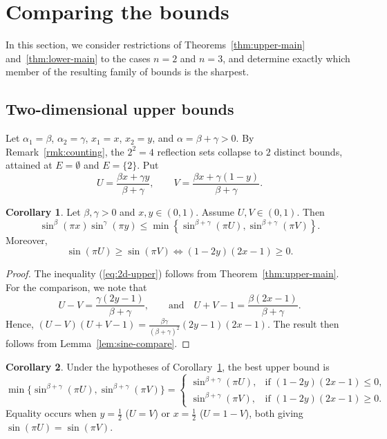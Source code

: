 \documentclass[12pt]{amsart}
\theoremstyle{definition}
\newtheorem{corollary}{Corollary}[section]
\begin{document}

\section{Comparing the bounds}
\label{sec:compare}

In this section, we consider restrictions of Theorems~\ref{thm:upper-main} and~\ref{thm:lower-main} to the cases $n=2$ and
$n=3$, and determine exactly which member of the resulting family of bounds is the sharpest.

\subsection{Two-dimensional upper bounds}

Let $\alpha_1 = \beta$, $\alpha_2 = \gamma$, $x_1 = x$, $x_2 = y$, and $\alpha = \beta + \gamma > 0$. By Remark~\ref{rmk:counting}, the $2^2=4$ reflection sets collapse to $2$ distinct bounds, attained at $E=\emptyset$ and $E=\{2\}$. Put
\[
U = \frac{\beta x + \gamma y}{\beta + \gamma}, \qquad V = \frac{\beta x + \gamma(1-y)}{\beta + \gamma}.
\]

\begin{corollary}\label{cor:2d-upper}
Let $\beta,\gamma > 0$ and $x,y \in (0,1)$. Assume $U,V \in (0,1)$. Then
\begin{equation}\label{eq:2d-upper}
\sin^{\beta}(\pi x) \sin^{\gamma}(\pi y) \leq \min\left\{\sin^{\beta+\gamma}(\pi U), \sin^{\beta+\gamma}(\pi V)\right\}.
\end{equation}
Moreover,
\[
\sin(\pi U) \geq \sin(\pi V) \iff (1 - 2y)(2x - 1) \geq 0.
\]
\end{corollary}

\begin{proof}
The inequality (\ref{eq:2d-upper}) follows from Theorem~\ref{thm:upper-main}. For the comparison, we note that
\[
U - V = \frac{\gamma(2y - 1)}{\beta + \gamma}, \qquad\text{and}\quad
U + V - 1 = \frac{\beta(2x - 1)}{\beta + \gamma}.
\]
Hence, $(U - V)(U + V - 1) = \frac{\beta\gamma}{(\beta + \gamma)^2}(2y - 1)(2x - 1)$. The result then follows from Lemma~\ref{lem:sine-compare}.
\end{proof}

\begin{corollary}\label{cor:2d-upper-best}
Under the hypotheses of Corollary~\ref{cor:2d-upper}, the best upper bound is
\[
\min\{\sin^{\beta+\gamma}(\pi U), \sin^{\beta+\gamma}(\pi V)\}
=
\begin{cases}
\sin^{\beta+\gamma}(\pi U), & \text{if } (1 - 2y)(2x - 1) \leq 0, \\
\sin^{\beta+\gamma}(\pi V), & \text{if } (1 - 2y)(2x - 1) \geq 0.
\end{cases}
\]
Equality occurs when $y = \frac{1}{2}$ ($U=V$) or $x = \frac{1}{2}$ ($U=1-V$), both giving $\sin(\pi U)=\sin(\pi V)$.
\end{corollary}
\end{document}
